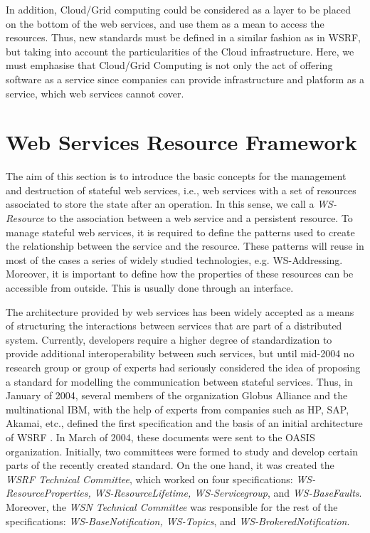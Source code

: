 In addition, Cloud/Grid computing could be considered as a layer to be placed on the bottom of the web services, 
and use them as a mean to access the resources. Thus, new standards must be defined in a similar fashion as in
WSRF, but taking into account the particularities of the Cloud infrastructure. Here, we must emphasise that Cloud/Grid 
Computing is not only the act of offering software as a service since companies can provide infrastructure and platform as a service, 
which web services cannot cover. 

\section{Web Services Resource Framework}

The aim of this section is to introduce the basic concepts for the management 
and destruction of stateful web services, i.e., web services with 
a set of resources associated to store the
state after an operation. In this sense, we call a \emph{WS-Resource} 
to the association between a web service and a persistent resource.
To manage stateful web services, it is required to 
define the patterns used to create the relationship between the service and the resource. These patterns
will reuse in most of the cases a series of widely studied technologies, e.g. WS-Addressing. 
Moreover, it is important to define how the properties of these resources can be accessible 
from outside. This is usually done through an interface.

The architecture provided by web services has been widely accepted as a means of 
structuring the interactions between services that are part of a distributed system. 
Currently, developers require a higher 
degree of standardization to provide additional interoperability between such services, 
but until mid-2004 no research group or group of experts had seriously considered the idea of 
proposing a standard for modelling the communication between stateful services.
Thus, in January of 2004, several members of the organization Globus Alliance and the multinational IBM, with 
the help of experts from companies such as HP, SAP, Akamai, etc., defined
the first specification and the basis of an initial architecture of WSRF \cite{WSRFstandard}. 
In March of 2004, these documents were sent to the OASIS organization. Initially, two committees were formed to study and develop 
certain parts of the recently created standard. 
On the one hand, it was created the \emph{WSRF Technical Committee}, which worked on four specifications:
\emph{WS-ResourceProperties, WS-ResourceLifetime, WS-Servicegroup}, 
and \emph{WS-BaseFaults}. Moreover, the \emph{WSN Technical Committee} 
was responsible for the rest of the specifications: \emph{WS-BaseNotification, WS-Topics}, and \emph{WS-BrokeredNotification}.

